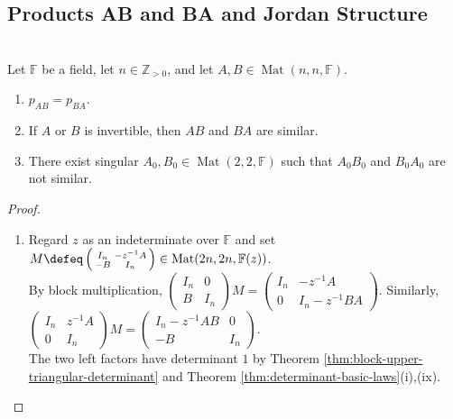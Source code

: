 \subsection{Products AB and BA and Jordan Structure}

\begin{proposition} \label{prop:ab-ba-characteristic-polynomial-and-similarity} \\
Let $\mathbb{F}$ be a field, let $n\in\mathbb{Z}_{>0}$, and let $A,B\in\operatorname{Mat}(n,n,\mathbb{F})$.
\begin{enumerate}[label=(\roman*)]
\setlength{\itemsep}{0pt}
\item $p_{AB}=p_{BA}$.
\item If $A$ or $B$ is invertible, then $AB$ and $BA$ are similar.
\item There exist singular $A_0,B_0\in\operatorname{Mat}(2,2,\mathbb{F})$ such that $A_0B_0$ and $B_0A_0$ are not similar.
\end{enumerate}
\begin{proof}
\begin{enumerate}[label=(\roman*)]
\setlength{\itemsep}{0pt}
\item Regard $z$ as an indeterminate over $\mathbb{F}$ and set $M\defeq\left(\begin{smallmatrix}I_n&-z^{-1}A\\-B&I_n\end{smallmatrix}\right)\in\operatorname{Mat}(2n,2n,\mathbb{F}(z))$.\\
By block multiplication, $\left(\begin{smallmatrix}I_n&0\\B&I_n\end{smallmatrix}\right)M=\left(\begin{smallmatrix}I_n&-z^{-1}A\\0&I_n-z^{-1}BA\end{smallmatrix}\right)$. Similarly, $\left(\begin{smallmatrix}I_n&z^{-1}A\\0&I_n\end{smallmatrix}\right)M=\left(\begin{smallmatrix}I_n-z^{-1}AB&0\\-B&I_n\end{smallmatrix}\right)$.\\
The two left factors have determinant $1$ by Theorem \ref{thm:block-upper-triangular-determinant} and Theorem \ref{thm:determinant-basic-laws}(i),(ix).\\

\end{enumerate}
\end{proof}
\end{proposition}
